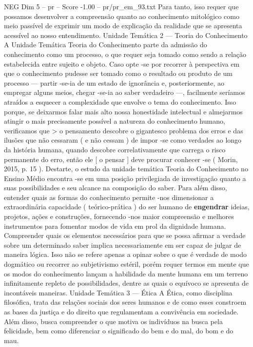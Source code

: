 \begin{textsample}{NEG Dim 5 – pr – Score -1.00 – pr/pr\_em\_93.txt}
Para tanto, isso requer que possamos desenvolver a compreensão quanto ao conhecimento mitológico como meio passível de exprimir um modo de explicação da realidade que se apresenta acessível ao nosso entendimento.
Unidade Temática 2 — Teoria do Conhecimento A Unidade Temática Teoria do Conhecimento parte da admissão do conhecimento como um processo, o que requer seja tomado como sendo a relação estabelecida entre sujeito e objeto.
Caso opte -se por recorrer à perspectiva em que o conhecimento pudesse ser tomado como o resultado ou produto de um processo — partir -se-ia de um estado de ignorância e, posteriormente, ao empregar alguns meios, chegar -se-ia ao saber verdadeiro —, facilmente seríamos atraídos a esquecer a complexidade que envolve o tema do conhecimento.
Isso porque, se deixarmos falar mais alto nossa honestidade intelectual e almejarmos atingir o mais precisamente possível a natureza do conhecimento humano, verificamos que > o pensamento descobre o gigantesco problema dos erros e das ilusões que não cessaram ( e não cessam ) de impor -se como verdades ao longo da história humana, quando descobre correlativamente que carrega o risco permanente do erro, então ele [ o pensar ] deve procurar conhecer -se ( Morin, 2015, p. 15 ).
Destarte, o estudo da unidade temática Teoria do Conhecimento no Ensino Médio encontra -se em uma posição privilegiada de investigação quanto a suas possibilidades e seu alcance na composição do saber.
Para além disso, entender quais as formas do conhecimento permite -nos dimensionar a extraordinária capacidade ( teórico-prática ) do ser humano de \textbf{engendrar} ideias, projetos, ações e construções, fornecendo -nos maior compreensão e melhores instrumentos para fomentar modos de vida em prol da dignidade humana.
Compreender quais os elementos necessários para que se possa afirmar a verdade sobre um determinado saber implica necessariamente em ser capaz de julgar de maneira lógica.
Isso não se refere apenas a opinar sobre o que é verdade de modo dogmático ou recorrer ao subjetivismo estéril, porém requer termos em mente que os modos do conhecimento lançam a habilidade da mente humana em um terreno infinitamente repleto de possibilidades, dentre as quais o equívoco se apresenta de incontáveis maneiras.
Unidade Temática 3 — Ética A Ética, como disciplina filosófica, trata das relações sociais dos seres humanos e de como esses constroem as bases da justiça e do direito que regulamentam a convivência em sociedade.
Além disso, busca compreender o que motiva os indivíduos na busca pela felicidade, bem como diferenciar o significado do bem e do mal, do bom e do mau.

\end{textsample}
